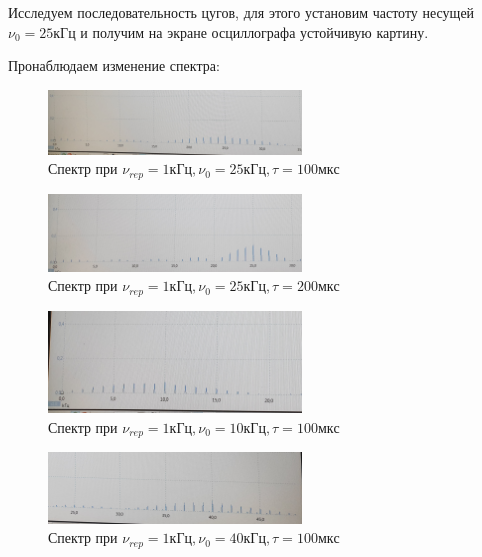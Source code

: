 \documentclass[11pt]{article}
\begin{document}
Исследуем последовательность цугов, для этого установим частоту несущей \( \nu_0 = 25кГц \) и получим на экране осциллографа устойчивую картину.

Пронаблюдаем изменение спектра:

\begin{figure}[H]
    \centering
    \includegraphics[width=0.6\textwidth]{cug_1.jpg}
    \caption{Спектр при \( \nu_{rep} = 1кГц, \nu_0 = 25 кГц, \tau = 100мкс\)}
    \label{spec_cug_1}
\end{figure}

\begin{figure}[H]
    \centering
    \includegraphics[width=0.6\textwidth]{cug_2.jpg}
    \caption{Спектр при \( \nu_{rep} = 1кГц, \nu_0 = 25 кГц, \tau = 200мкс\)} 
    \label{spec_cug_2}
\end{figure}

\begin{figure}[H]
    \centering
    \includegraphics[width=0.6\textwidth]{cug_3.jpg}
    \caption{Спектр при \( \nu_{rep} = 1кГц, \nu_0 = 10 кГц, \tau = 100мкс\)} 
    \label{spec_cug_2}
\end{figure}

\begin{figure}[H]
    \centering
    \includegraphics[width=0.6\textwidth]{cug_4.jpg}
    \caption{Спектр при \( \nu_{rep} = 1кГц, \nu_0 = 40 кГц, \tau = 100мкс\)} 
    \label{spec_cug_2}
\end{figure}
\end{document}
